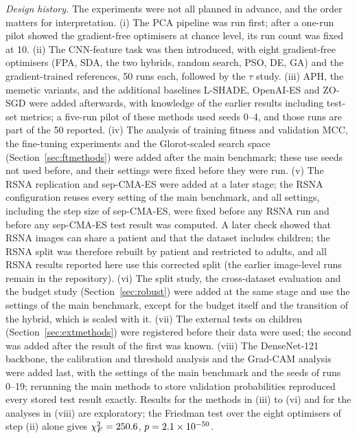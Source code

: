 \documentclass[10pt,letterpaper]{article}
\begin{document}
\emph{Design history.} The experiments were not all planned in advance, and the order matters for interpretation. (i) The PCA pipeline was run first; after a one-run pilot showed the gradient-free optimisers at chance level, its run count was fixed at 10. (ii) The CNN-feature task was then introduced, with eight gradient-free optimisers (FPA, SDA, the two hybrids, random search, PSO, DE, GA) and the gradient-trained references, 50 runs each, followed by the $\tau$ study. (iii) APH, the memetic variants, and the additional baselines L-SHADE, OpenAI-ES and ZO-SGD were added afterwards, with knowledge of the earlier results including test-set metrics; a five-run pilot of these methods used seeds 0--4, and those runs are part of the 50 reported. (iv) The analysis of training fitness and validation MCC, the fine-tuning experiments and the Glorot-scaled search space (Section~\ref{sec:ftmethods}) were added after the main benchmark; these use seeds not used before, and their settings were fixed before they were run. (v) The RSNA replication and sep-CMA-ES were added at a later stage; the RSNA configuration reuses every setting of the main benchmark, and all settings, including the step size of sep-CMA-ES, were fixed before any RSNA run and before any sep-CMA-ES test result was computed. A later check showed that RSNA images can share a patient and that the dataset includes children; the RSNA split was therefore rebuilt by patient and restricted to adults, and all RSNA results reported here use this corrected split (the earlier image-level runs remain in the repository). (vi) The split study, the cross-dataset evaluation and the budget study (Section~\ref{sec:robust}) were added at the same stage and use the settings of the main benchmark, except for the budget itself and the transition of the hybrid, which is scaled with it. (vii) The external tests on children (Section~\ref{sec:extmethods}) were registered before their data were used; the second was added after the result of the first was known. (viii) The DenseNet-121 backbone, the calibration and threshold analysis and the Grad-CAM analysis were added last, with the settings of the main benchmark and the seeds of runs 0--19; rerunning the main methods to store validation probabilities reproduced every stored test result exactly. Results for the methods in (iii) to (vi) and for the analyses in (viii) are exploratory; the Friedman test over the eight optimisers of step (ii) alone gives $\chi^2_F=250.6$, $p=2.1\times 10^{-50}$.
\end{document}
